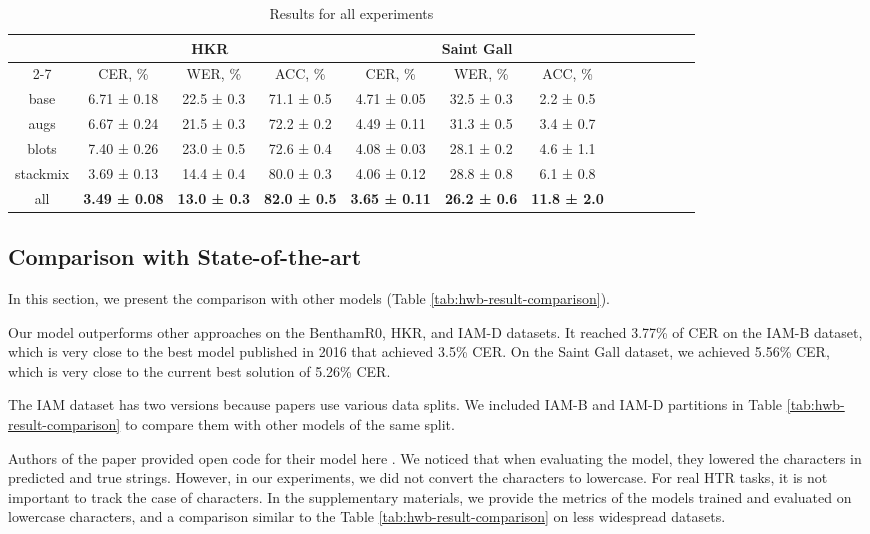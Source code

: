 \documentclass[10pt,twocolumn,letterpaper]{article}
\begin{document}
\begin{table*}[ht]
\begin{center}
\begin{tabular}{|c|c|c|c|c|c|c|c|c|c|c|c|c|}
\hline
\hline
\multirow{3}{*}{ } 
& \multicolumn{3}{c|}{HKR} &  \multicolumn{3}{c|}{Saint Gall} \\
\cline{2-7}
& CER, \% & WER, \% & ACC, \% & CER, \% & WER, \% & ACC, \% \\
\hline
base & 6.71 ± 0.18 & 22.5 ± 0.3 & 71.1 ± 0.5 & 4.71 ± 0.05 & 32.5 ± 0.3 & 2.2 ± 0.5 \\
augs & 6.67 ± 0.24 & 21.5 ± 0.3 & 72.2 ± 0.2 & 4.49 ± 0.11 & 31.3 ± 0.5 & 3.4 ± 0.7  \\
blots & 7.40 ± 0.26 & 23.0 ± 0.5 & 72.6 ± 0.4 & 4.08 ± 0.03 & 28.1 ± 0.2 & 4.6 ± 1.1 \\
stackmix & 3.69 ± 0.13 & 14.4 ± 0.4 & 80.0 ± 0.3 & 4.06 ± 0.12 & 28.8 ± 0.8 & 6.1 ± 0.8  \\
all & \textbf{3.49 ± 0.08} & \textbf{13.0 ± 0.3} & \textbf{82.0 ± 0.5} & \textbf{3.65 ± 0.11} & \textbf{26.2 ± 0.6} & \textbf{11.8 ± 2.0} \\
\hline
\end{tabular}

\end{center}
\caption{\label{tab:all-results-table} Results for all experiments}
\end{table*}

\subsection{Comparison with State-of-the-art}
In this section, we present the comparison with other models (Table \ref{tab:hwb-result-comparison}).

Our model outperforms other approaches on the BenthamR0, HKR, and IAM-D datasets. It reached 3.77\% of CER on the IAM-B dataset, which is very close to the best model published in 2016 that achieved 3.5\% CER. On the Saint Gall dataset, we achieved 5.56\% CER, which is very close to the current best solution of 5.26\% CER.

The IAM dataset has two versions because  papers use various data splits. We included IAM-B and IAM-D partitions in Table \ref{tab:hwb-result-comparison} to compare them with other models of the same split.

Authors of the paper \cite{de2020htr} provided open code for their model here \cite{htrflorlink}. We noticed that when evaluating the model, they lowered the characters in predicted and true strings. However, in our experiments, we did not convert the characters to lowercase. For real HTR tasks, it is not important to track the case of characters. In the supplementary materials, we provide the metrics of the models trained and evaluated on lowercase characters, and a comparison similar to the Table \ref{tab:hwb-result-comparison} on less widespread datasets.
\end{document}
